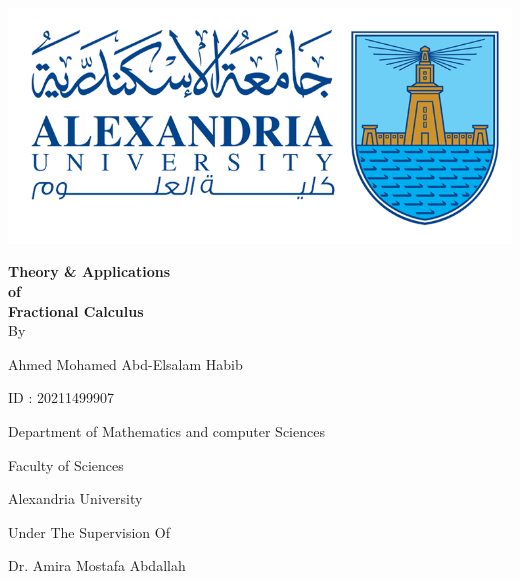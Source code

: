 \begingroup
{}
\begin{center}
    \includegraphics[scale=.5]{collage logo.png}
    \vspace*{1cm}
    \par
    {\fontsize{20pt}{30pt}\selectfont
        {\fontsize{30pt}{40pt}\selectfont
        \textbf{Theory \& Applications \\ of \\ Fractional Calculus}
        }
        \\
        \vspace*{.75cm}
        By
        \vspace*{.75cm}

        Ahmed Mohamed Abd-Elsalam Habib

        ID : 20211499907

        Department of Mathematics and computer Sciences

        Faculty of Sciences

        Alexandria University

        \vspace*{\fill}
        Under The Supervision Of
        
        Dr. Amira Mostafa Abdallah
    }
\end{center}
\restoregeometry
\endgroup
\newpage
\tableofcontents
\thispagestyle{empty}
\newpage
\setcounter{page}{1}